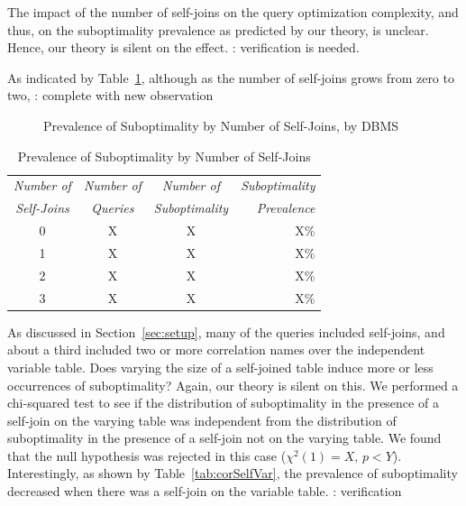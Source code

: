 {The impact of the number of self-joins on the query optimization complexity, 
and thus, on the suboptimality prevalence as predicted by our theory,
is unclear. Hence, our theory is silent on the effect. {\todo: verification is
needed.}

As indicated by Table~\ref{tab:numselfjoin}, although as the number of
self-joins grows from zero to two, {\todo: complete with new observation}

\begin{figure}
\begin{center}
\end{center}
\caption{Prevalence of Suboptimality by Number of Self-Joins, by
DBMS\label{fig:numselfjoin}}
\end{figure}

\begin{table}
\begin{center}
\begin{tabular}{c|c|c|r}
{\em Number of} & {\em Number of} & {\em Number of} & \multicolumn{1}{|c}{\em Suboptimality}\\
{\em Self-Joins}&{\em Queries}&{\em Suboptimality}&{\em Prevalence}\\
\hline
0 & X & X & X\%\\
1 & X & X & X\%\\
2 & X & X & X\%\\
3 & X & X & X\%

\end{tabular}
\end{center}
\caption{Prevalence of Suboptimality by Number of
Self-Joins\label{tab:numselfjoin}}
\end{table}

As discussed in Section~\ref{sec:setup}, many of the queries included
self-joins, and about a third included two or more correlation names over the
independent variable table. Does varying the size of a self-joined table
induce more or less occurrences of suboptimality? Again, our theory is silent
on this. We performed a chi-squared test to see if the distribution of
suboptimality in the presence of a self-join on the varying
table was independent from the distribution of suboptimality in the presence
of a self-join not on the varying table. We found that the null hypothesis was 
rejected in this case ($\chi^2(1)=X,\,p<Y$). Interestingly, 
as shown by Table~\ref{tab:corSelfVar}, the prevalence of suboptimality
decreased when there was a self-join on the variable table.
{\todo: verification}

}
